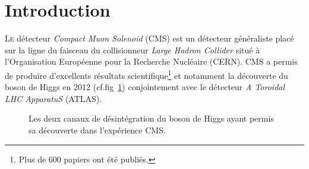 \chapter*{Introduction}
\renewcommand\chapterillustration{INT/INT}
\ThisULCornerWallPaper{1}{\chapterillustration}

\lettrine[lines=4, slope=-0.5em,nindent=10pt]{L}{e} détecteur \textit{Compact Muon Solenoid} (CMS) est un détecteur généraliste placé sur la ligne du faisceau du collisionneur \textit{Large Hadron Collider} situé à l'Organisation Européenne pour la Recherche Nucléaire (CERN). CMS a permis de produire d'excellents résultats scientifique\footnote{Plus de \num{600} papiers ont été publiés.} et notamment la découverte du boson de Higgs en \num{2012} (cf.fig~\ref{higgs}) conjointement avec le détecteur \textit{A Toroidal LHC ApparatuS} (ATLAS). 
\vspace*{-0.4cm}
\begin{figure}[ht!]
	\centering
	\hfill
	\caption{Les deux canaux de désintégration du boson de Higgs ayant permis sa découverte dans l'expérience CMS.}
	\label{higgs}
\end{figure}
